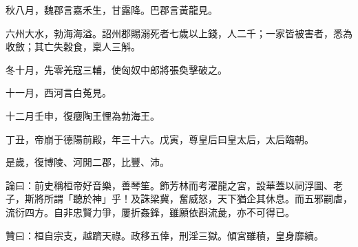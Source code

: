 \begin{pinyinscope}
秋八月，魏郡言嘉禾生，甘露降。巴郡言黃龍見。

六州大水，勃海海溢。詔州郡賜溺死者七歲以上錢，人二千；一家皆被害者，悉為收斂；其亡失穀食，稟人三斛。

冬十月，先零羌寇三輔，使匈奴中郎將張奐擊破之。

十一月，西河言白菟見。

十二月壬申，復癭陶王悝為勃海王。

丁丑，帝崩于德陽前殿，年三十六。戊寅，尊皇后曰皇太后，太后臨朝。

是歲，復博陵、河閒二郡，比豐、沛。

論曰：前史稱桓帝好音樂，善琴笙。飾芳林而考濯龍之宮，設華蓋以祠浮圖、老子，斯將所謂「聽於神」乎！及誅梁冀，奮威怒，天下猶企其休息。而五邪嗣虐，流衍四方。自非忠賢力爭，屢折姦鋒，雖願依斟流彘，亦不可得已。

贊曰：桓自宗支，越躋天祿。政移五倖，刑淫三獄。傾宮雖積，皇身靡續。


\end{pinyinscope}